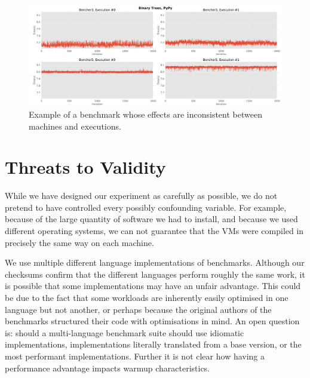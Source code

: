 \documentclass[10pt,preprint]{sigplanconf}
\begin{document}
\begin{figure}[h!]
\centering
\includegraphics[width=\textwidth]{examples/inconsistent_weirdness1}
\caption{Example of a benchmark whose effects are inconsistent between machines and executions.}
\label{fig:examples:inconsistent_weirdness1}
\end{figure}


\section{Threats to Validity}
\label{sec:threats}


While we have designed our experiment as carefully as possible, we do not
pretend to have controlled every possibly confounding variable. For example,
because of the large quantity of software we had to install, and because we used
different operating systems, we can not guarantee that the VMs were compiled in
precisely the same way on each machine. 

We use multiple different language implementations of benchmarks. Although our
checksums confirm that the different languages perform roughly the same work,
it is possible that some implementations may have an unfair advantage. This
could be due to the fact that some workloads are inherently easily optimised in
one language but not another, or perhaps because the original authors of the
benchmarks structured their code with optimisations in mind. An open question
is: should a multi-language benchmark suite should use idiomatic
implementations, implementations literally translated from a base version, or
the most performant implementations. Further it is not clear how having a
performance advantage impacts warmup characteristics.
\end{document}
